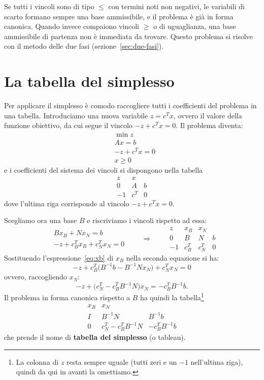 \begin{osservazione}
Se tutti i vincoli sono di tipo $\le$ con termini noti non negativi, le variabili di scarto formano sempre una base ammissibile, e il problema è già in forma canonica. Quando invece compaiono vincoli $\ge$ o di uguaglianza, una base ammissibile di partenza non è immediata da trovare. Questo problema si risolve con il metodo delle due fasi (sezione~\ref{sec:due-fasi}).
\end{osservazione}

\section{La tabella del simplesso}\label{sec:tabella}
Per applicare il simplesso è comodo raccogliere tutti i coefficienti del problema in una tabella. Introduciamo una nuova variabile $z = c^T x$, ovvero il valore della funzione obiettivo, da cui segue il vincolo $-z + c^T x = 0$. Il problema diventa:
\[
\begin{aligned}
&\min z \\
&A x = b \\
&{-z} + c^T x = 0 \\
&x \ge 0
\end{aligned}
\]
e i coefficienti del sistema dei vincoli si dispongono nella tabella
\[
\begin{array}{c|c|c}
z & x & \\
\hline
0 & A & b \\
\hline
-1 & c^T & 0
\end{array}
\]
dove l'ultima riga corrisponde al vincolo $-z + c^T x = 0$.

Scegliamo ora una base $B$ e riscriviamo i vincoli rispetto ad essa:
\[
\begin{aligned}
&B x_B + N x_N = b \\
&{-z} + c_B^T x_B + c_N^T x_N = 0
\end{aligned}
\qquad\Longrightarrow\qquad
\begin{array}{c|c|c|c}
z & x_B & x_N & \\
\hline
0 & B & N & b \\
\hline
-1 & c_B^T & c_N^T & 0
\end{array}
\]
Sostituendo l'espressione~\eqref{eq:xb} di $x_B$ nella seconda equazione si ha:
\[
-z + c_B^T \big(B^{-1}b - B^{-1}N x_N\big) + c_N^T x_N = 0
\]
ovvero, raccogliendo $x_N$:
\[
-z + \big(c_N^T - c_B^T B^{-1} N\big) x_N = -c_B^T B^{-1} b.
\]
Il problema in forma canonica rispetto a $B$ ha quindi la tabella\footnote{La colonna di $z$ resta sempre uguale (tutti zeri e un $-1$ nell'ultima riga), quindi da qui in avanti la omettiamo.}
\begin{equation}\label{eq:tabella}
\begin{array}{c|c|c}
x_B & x_N & \\
\hline
I & B^{-1} N & B^{-1} b \\
\hline
0 & c_N^T - c_B^T B^{-1} N & -c_B^T B^{-1} b
\end{array}
\end{equation}
che prende il nome di \textbf{tabella del simplesso} (o tableau).

